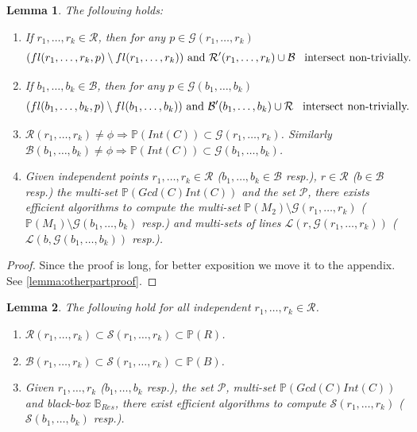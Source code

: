 \documentclass[12pt]{caltech_thesis}
\theoremstyle{plain}
\newtheorem{lemma}{Lemma}
\theoremstyle{definition}
\newcommand{\MS}{\mathcal{S}}
\newcommand{\MB}{\mathcal{B}}
\newcommand{\ML}{\mathcal{L}}
\newcommand{\MP}{\mathcal{P}}
\newcommand{\MR}{\mathcal{R}}
\newcommand{\MG}{\mathcal{G}}
\newcommand{\CB}{\mathbb{B}}
\newcommand{\PP}{\mathbb{P}}
\begin{document}
 
 \begin{lemma}\label{lemma:otherpart}
 The following holds:
 \begin{enumerate}
  \item If $r_1,\ldots,r_k\in \MR$, then for any $p\in \MG(r_1,\ldots,r_k)$   
  \[
  (fl(r_1,\ldots,r_k,p)\setminus fl(r_1,\ldots,r_k)) \text{ and } \MR^\prime(r_1,\ldots,r_k)\cup \MB \hspace{0.5em}\text{ intersect non-trivially.}                                     
 \]

 \item If $b_1,\ldots,b_k\in \MB$, then for any $p\in \MG(b_1,\ldots,b_k)$
  \[
  (fl(b_1,\ldots,b_k,p)\setminus fl(b_1,\ldots,b_k)) \text{ and } \MB^\prime(b_1,\ldots,b_k)\cup \MR \hspace{0.5em}\text{ intersect non-trivially.}
 \]
 \item $\MR(r_1,\ldots,r_k) \neq\phi \Rightarrow \PP(Int(C)) \subset \MG(r_1,\ldots,r_k)$. Similarly 
 $\MB(b_1,\ldots,b_k) \neq\phi \Rightarrow \PP(Int(C))\subset \MG(b_1,\ldots,b_k)$.
 
 \item Given independent points $r_1,\ldots,r_k \in \MR$ ($b_1,\ldots,b_k \in \MB$ resp.), $r\in \MR$ ($b\in \MB$ resp.)
 the multi-set $\PP(Gcd(C)Int(C))$ and the set $\MP$,
 there exists efficient algorithms to compute the multi-set $\PP(M_2)\setminus \MG(r_1,\ldots,r_k)$ 
 ($\PP(M_1)\setminus \MG(b_1,\ldots,b_k)$ resp.) and multi-sets of lines 
 $\ML(r,\MG(r_1,\ldots,r_k))$ ($\ML(b,\MG(b_1,\ldots,b_k))$ resp.).
 \end{enumerate}
 \end{lemma}
 
 \begin{proof}
  Since the proof is long, for better exposition we move it to the appendix. See \ref{lemma:otherpartproof}.
 \end{proof}


 \begin{lemma}\label{lemma:goodset}
  The following hold for all independent $r_1,\ldots,r_k \in \MR$.
  \begin{enumerate}
   \item $\MR(r_1,\ldots,r_k) \subset \MS(r_1,\ldots,r_k)\subset \PP(R)$.
   \item $\MB(r_1,\ldots,r_k) \subset \MS(r_1,\ldots,r_k)\subset \PP(B)$.
   \item Given $r_1,\ldots,r_k$ ($b_1,\ldots,b_k$ resp.), the set $\MP$, multi-set $\PP(Gcd(C)Int(C))$ and 
   black-box $\CB_{Res}$, there exist efficient algorithms to compute $\MS(r_1,\ldots,r_k)$ ($\MS(b_1,\ldots,b_k)$ resp.).
  \end{enumerate}

 \end{lemma}
\end{document}
